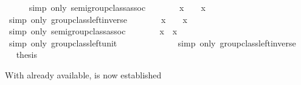 \begin{isabellebody}
\ \ \ \ \isamarkupfalse%
\ {\isacharparenleft}simp\ only{\isacharcolon}\ semigroup{\isacharunderscore}class{\isachardot}assoc{\isacharparenright}\isanewline
\ \ \isamarkupfalse%
\ \isamarkupfalse%
\ {\isachardoublequoteopen}{\isachardot}{\isachardot}{\isachardot}\ {\isacharequal}\ {\isacharparenleft}x{\isasyminv}{\isacharparenright}{\isasyminv}\ {\isasymodot}\ {\isasymone}\ {\isasymodot}\ x{\isasyminv}{\isachardoublequoteclose}\isanewline
\ \ \ \ \isamarkupfalse%
\ {\isacharparenleft}simp\ only{\isacharcolon}\ group{\isacharunderscore}class{\isachardot}left{\isacharunderscore}inverse{\isacharparenright}\isanewline
\ \ \isamarkupfalse%
\ \isamarkupfalse%
\ {\isachardoublequoteopen}{\isachardot}{\isachardot}{\isachardot}\ {\isacharequal}\ {\isacharparenleft}x{\isasyminv}{\isacharparenright}{\isasyminv}\ {\isasymodot}\ {\isacharparenleft}{\isasymone}\ {\isasymodot}\ x{\isasyminv}{\isacharparenright}{\isachardoublequoteclose}\isanewline
\ \ \ \ \isamarkupfalse%
\ {\isacharparenleft}simp\ only{\isacharcolon}\ semigroup{\isacharunderscore}class{\isachardot}assoc{\isacharparenright}\isanewline
\ \ \isamarkupfalse%
\ \isamarkupfalse%
\ {\isachardoublequoteopen}{\isachardot}{\isachardot}{\isachardot}\ {\isacharequal}\ {\isacharparenleft}x{\isasyminv}{\isacharparenright}{\isasyminv}\ {\isasymodot}\ x{\isasyminv}{\isachardoublequoteclose}\isanewline
\ \ \ \ \isamarkupfalse%
\ {\isacharparenleft}simp\ only{\isacharcolon}\ group{\isacharunderscore}class{\isachardot}left{\isacharunderscore}unit{\isacharparenright}\isanewline
\ \ \isamarkupfalse%
\ \isamarkupfalse%
\ {\isachardoublequoteopen}{\isachardot}{\isachardot}{\isachardot}\ {\isacharequal}\ {\isasymone}{\isachardoublequoteclose}\isanewline
\ \ \ \ \isamarkupfalse%
\ {\isacharparenleft}simp\ only{\isacharcolon}\ group{\isacharunderscore}class{\isachardot}left{\isacharunderscore}inverse{\isacharparenright}\isanewline
\ \ \isamarkupfalse%
\ \isamarkupfalse%
\ {\isacharquery}thesis\ \isacommand{{\isachardot}}\isamarkupfalse%
\isanewline
{}\isamarkupfalse%
%
\endisatagproof
{\isafoldproof}%
%
\isadelimproof
%
\endisadelimproof
%
\begin{isamarkuptext}%
\noindent With  already available, \label{thm:group-right-unit} is now established

\end{isamarkuptext}
\end{isabellebody}
